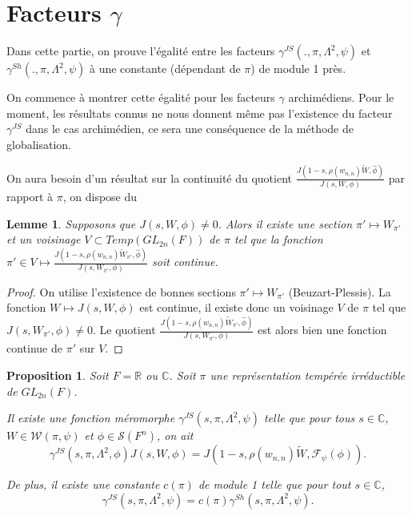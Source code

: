 \documentclass{amsart}
\newtheorem{proposition}{Proposition}[section]
\newtheorem{lemme}{Lemme}[section]
\begin{document}
 \section{Facteurs $\gamma$}
 
 Dans cette partie, on prouve l'égalité entre les facteurs $\gamma^{JS}(., \pi, \Lambda^2, \psi)$ et $\gamma^{Sh}(., \pi, \Lambda^2, \psi)$ à une constante (dépendant de $\pi$) de module 1 près.
 
 On commence à montrer cette égalité pour les facteurs $\gamma$ archimédiens. Pour le moment, les résultats connus ne nous donnent même pas l'existence du facteur $\gamma^{JS}$ dans le cas archimédien, ce sera une conséquence de la méthode de globalisation.
 
 On aura besoin d'un résultat sur la continuité du quotient $\frac{J(1-s, \rho(w_{n,n})\tilde{W}, \hat{\phi})}{J(s, W, \phi)}$ par rapport à $\pi$, on dispose du
 \begin{lemme}
 \label{cont}
 Supposons que $J(s, W, \phi) \neq 0$. Alors il existe une section $\pi' \mapsto W_{\pi'}$ et un voisinage $V \subset Temp(GL_{2n}(F))$ de $\pi$ tel que la fonction $\pi' \in V \mapsto \frac{J(1-s, \rho(w_{n,n})\tilde{W}_{\pi'}, \hat{\phi})}{J(s, W_{\pi'}, \phi)}$ soit continue.
 \end{lemme}
 
 \begin{proof}
 On utilise l'existence de bonnes sections $\pi' \mapsto W_{\pi'}$ (Beuzart-Plessis). La fonction $W \mapsto J(s, W, \phi)$ est continue, il existe donc un voisinage $V$ de $\pi$ tel que $J(s, W_{\pi'}, \phi) \neq 0$. Le quotient $\frac{J(1-s, \rho(w_{n,n})\tilde{W}_{\pi'}, \hat{\phi})}{J(s, W_{\pi'}, \phi)}$ est alors bien une fonction continue de $\pi'$ sur $V$. 
 \end{proof}
 
 \begin{proposition}
 Soit $F = \mathbb{R}$ ou $\mathbb{C}$. Soit $\pi$ une représentation tempérée irréductible de $GL_{2n}(F)$. 
 
 Il existe une fonction méromorphe $\gamma^{JS}(s,\pi,\Lambda^2,\psi)$ telle que pour tous $s \in \mathbb{C}$, $W \in \mathcal{W}(\pi, \psi)$ et $\phi \in \mathcal{S}(F^n)$, on ait
 \begin{equation}
 \gamma^{JS}(s, \pi, \Lambda^2, \phi) J(s, W, \phi) = J(1-s, \rho(w_{n,n})\tilde{W}, \mathcal{F}_\psi(\phi)).
 \end{equation}
 
 De plus, il existe une constante $c(\pi)$ de module 1 telle que pour tout $s \in \mathbb{C}$,
 \begin{equation}
 \gamma^{JS}(s, \pi, \Lambda^2, \psi) = c(\pi)\gamma^{Sh}(s, \pi, \Lambda^2, \psi).
 \end{equation}
 \end{proposition}
 
\end{document}
